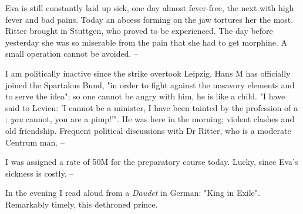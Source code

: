 
Eva is still constantly laid up sick, one day almost fever-free, the next with high fever and bad pains. Today an abcess forming on the jaw tortures her the most. Ritter brought in Stuttgen, who proved to be experienced. The day before yesterday she was so miserable from the pain that she had to get morphine. A small operation cannot be avoided. --

\missing

I am politically inactive since the strike overtook Leipzig. Hans M has officially joined the Spartakus Bund, "in order to fight against the unsavory elements and to serve the idea"; so one cannot be angry with him, he is like a child. "I have said to Levien: 'I cannot be a minister, I have been tainted by the profession of a ; \textit{you} cannot, you are a pimp!'". He was here in the morning; violent clashes and old friendship. Frequent political discussions with Dr Ritter, who is a moderate Centrum man. --

I was assigned a rate of 50M for the preparatory course today. Lucky, since Eva's sickness is costly. --

In the evening I read aloud from a \textit{Daudet} in German: "King in Exile". Remarkably timely, this dethroned prince.
